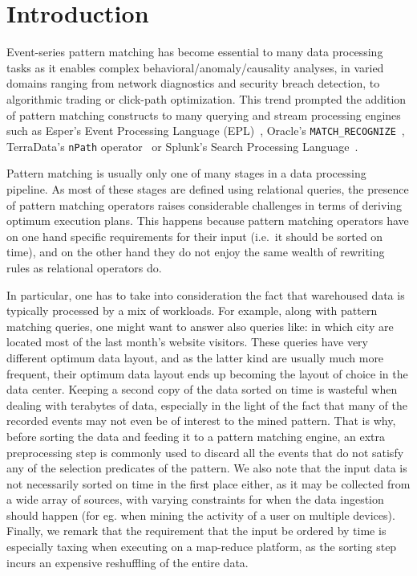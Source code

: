 \section{Introduction}


Event-series pattern matching has become essential to many data processing tasks
as it enables complex 
behavioral\allowbreak /\allowbreak anomaly\allowbreak /\allowbreak causality 
analyses, in varied domains ranging from network diagnostics and security 
breach detection, to algorithmic trading or click-path optimization.
This trend prompted the addition of pattern matching constructs to many 
querying and stream processing engines such as 
Esper's Event Processing Language (EPL)~\cite{esper_epl}, 
Oracle's \texttt{MATCH\_RECOGNIZE}~\cite{oracle_mr}, 
TerraData's \texttt{nPath} operator~\cite{aster_npath} or 
Splunk's Search Processing Language~\cite{Carasso:2012}.



Pattern matching is usually only one of many stages in a data processing 
pipeline. 
As most of these stages are defined using relational queries, the presence of 
pattern matching operators raises considerable challenges in terms of deriving 
optimum execution plans. 
This happens because pattern matching operators have on one hand specific 
requirements for their input (i.e.\ it should be sorted on time), and on the 
other hand they do not enjoy the same wealth of rewriting rules as relational 
operators do.  

In particular,
one has to take into consideration the fact that warehoused data is typically 
processed by a mix of workloads.
For example, along with pattern matching queries, one might want to answer also 
queries like: in which city are located most of the last month's website 
visitors. 
These queries have very different optimum data layout, and as the latter kind 
are usually much more frequent, their optimum data layout ends up becoming the 
layout of choice in the data center.
Keeping a second copy of the data sorted on time is wasteful when dealing with 
terabytes of data, especially in the light of the fact that many of the 
recorded events may not even be of interest to the mined pattern. 
That is why, before sorting the data and feeding it to a pattern matching 
engine, an extra preprocessing step is commonly used to discard all the events 
that do not satisfy any of the selection predicates of the pattern.     
We also note that the input data is not necessarily sorted on time in the first 
place either, as it may be collected from a wide array of sources, with varying 
constraints for when the data ingestion should happen (for eg. when mining the 
activity of a user on multiple devices). 
Finally, we remark that the requirement that the input be ordered by time is 
especially taxing when executing on a map-reduce platform, as the sorting step 
incurs an expensive reshuffling of the entire data. 


